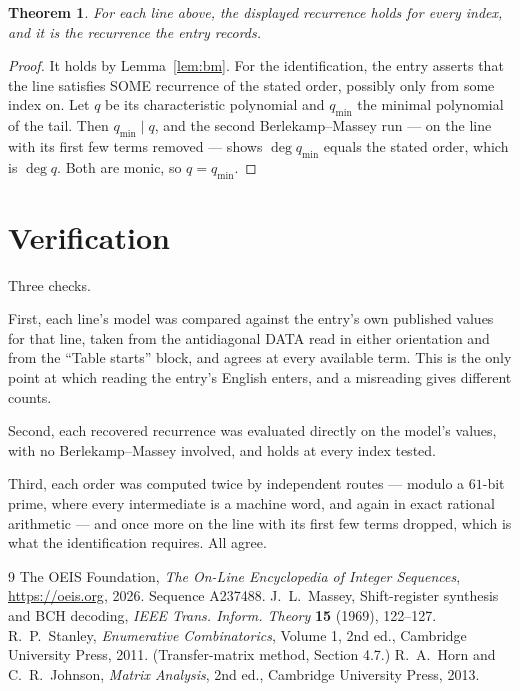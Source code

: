 \documentclass[11pt,a4paper]{article}
\theoremstyle{plain}
\newtheorem{theorem}{Theorem}
\theoremstyle{definition}
\begin{document}
\begin{theorem}
For each line above, the displayed recurrence holds for every index, and it is the recurrence
the entry records.
\end{theorem}

\begin{proof}
It holds by Lemma~\ref{lem:bm}. For the identification, the entry asserts that the line
satisfies SOME recurrence of the stated order, possibly only from some index on. Let $q$ be its
characteristic polynomial and $q_{\min}$ the minimal polynomial of the tail. Then
$q_{\min}\mid q$, and the second Berlekamp--Massey run --- on the line with its first few
terms removed --- shows $\deg q_{\min}$ equals the stated order, which is $\deg q$. Both are
monic, so $q=q_{\min}$.
\end{proof}

\section{Verification}

Three checks.

First, each line's model was compared against the entry's own published values for that line,
taken from the antidiagonal DATA read in either orientation and from the ``Table starts''
block, and agrees at every available term. This is the only point at which reading the entry's
English enters, and a misreading gives different counts.

Second, each recovered recurrence was evaluated directly on the model's values, with no
Berlekamp--Massey involved, and holds at every index tested.

Third, each order was computed twice by independent routes --- modulo a $61$-bit prime, where
every intermediate is a machine word, and again in exact rational arithmetic --- and once more
on the line with its first few terms dropped, which is what the identification requires. All
agree.

\begin{thebibliography}{9}
 The OEIS Foundation, \emph{The On-Line Encyclopedia of Integer
Sequences}, \url{https://oeis.org}, 2026. Sequence A237488.
 J.~L.~Massey, Shift-register synthesis and BCH decoding, \emph{IEEE
Trans. Inform. Theory} \textbf{15} (1969), 122--127.
 R.~P.~Stanley, \emph{Enumerative Combinatorics}, Volume 1, 2nd ed.,
Cambridge University Press, 2011. (Transfer-matrix method, Section 4.7.)
 R.~A.~Horn and C.~R.~Johnson, \emph{Matrix Analysis}, 2nd ed., Cambridge
University Press, 2013.
\end{thebibliography}
\end{document}
